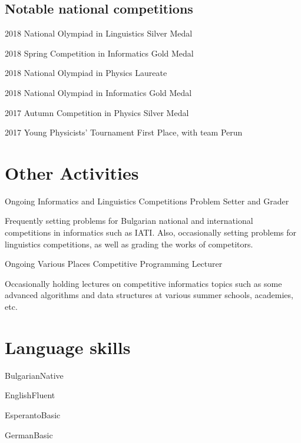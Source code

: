 \documentclass{tccv}
\begin{document}
\subsection{Notable national competitions}

\begin{yearlist}

\item{2018}
     {National Olympiad in Linguistics}
     {Silver Medal}

\item{2018}
     {Spring Competition in  Informatics}
     {Gold Medal}

\item{2018}
     {National Olympiad in Physics}
     {Laureate}

\item{2018}
     {National Olympiad in Informatics}
     {Gold Medal}

\item{2017}
     {Autumn Competition in Physics}
     {Silver Medal}

\item{2017}
     {Young Physicists' Tournament}
     {First Place, with team Perun}

\end{yearlist}

\newpage

\section{Other Activities}

\begin{eventlist}

\item{Ongoing}
     {Informatics and Linguistics Competitions}
     {Problem Setter and Grader}

Frequently setting problems for Bulgarian national and international competitions in informatics such as IATI. Also, occasionally setting problems for linguistics competitions, as well as grading the works of competitors.

\item{Ongoing}
     {Various Places}
     {Competitive Programming Lecturer}

Occasionally holding lectures on competitive informatics topics such as some advanced algorithms and data structures at various summer schools, academies, etc.

\end{eventlist}

\section{Language skills}

\begin{factlist}

\item{Bulgarian}{Native}
\item{English}{Fluent}
\item{Esperanto}{Basic}
\item{German}{Basic}

\end{factlist}
\end{document}
